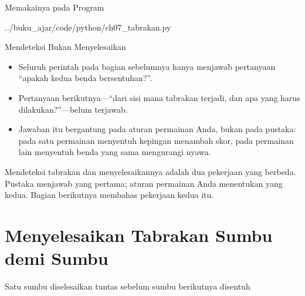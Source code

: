 \documentclass[aspectratio=169,10pt]{beamer}
\begin{document}
\begin{frame}[fragile]{Memakainya pada Program}

  {../buku_ajar/code/python/ch07_tabrakan.py}
\end{frame}

\begin{frame}{Mendeteksi Bukan Menyelesaikan}
\begin{itemize}
  \item Seluruh perintah pada bagian sebelumnya hanya menjawab pertanyaan
        ``apakah kedua benda bersentuhan?''.
  \item Pertanyaan berikutnya---``dari sisi mana tabrakan terjadi, dan apa yang
        harus dilakukan?''---belum terjawab.
  \item Jawaban itu bergantung pada aturan permainan Anda, bukan pada pustaka:
        pada satu permainan menyentuh kepingan menambah skor, pada permainan
        lain menyentuh benda yang sama mengurangi nyawa.
\end{itemize}
\vspace{0.2cm}
\begin{kotak}
Mendeteksi tabrakan dan menyelesaikannya adalah dua pekerjaan yang berbeda.
Pustaka menjawab yang pertama; aturan permainan Anda menentukan yang kedua.
Bagian berikutnya membahas pekerjaan kedua itu.
\end{kotak}
\end{frame}

\section{Menyelesaikan Tabrakan Sumbu demi Sumbu}
  {Satu sumbu diselesaikan tuntas sebelum sumbu berikutnya disentuh}
\end{document}
